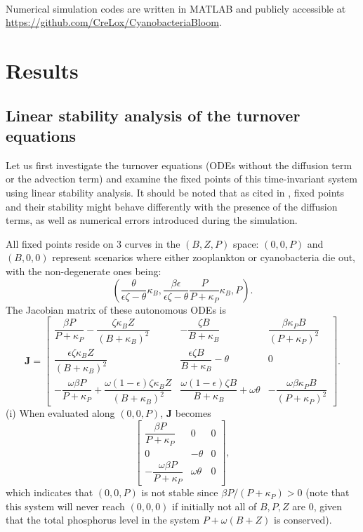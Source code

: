 \documentclass{article}
\renewcommand\vec{\mathbf}
\begin{document}
Numerical simulation codes are written in MATLAB\textsuperscript{\tiny\textregistered} and publicly accessible at \url{https://github.com/CreLox/CyanobacteriaBloom}.

\section*{Results}
\subsection*{Linear stability analysis of the turnover equations}
Let us first investigate the turnover equations (ODEs without the diffusion term or the advection term) and examine the fixed points of this time-invariant system using linear stability analysis. It should be noted that as cited in \cite{SteeleHenderson}, fixed points and their stability might behave differently with the presence of the diffusion terms, as well as numerical errors introduced during the simulation.

All fixed points reside on 3 curves in the $(B, Z, P)$ space: $(0, 0, P)$ and $(B, 0, 0)$ represent scenarios where either zooplankton or cyanobacteria die out, with the non-degenerate ones being:
\begin{equation}
    (\frac{\theta}{\epsilon\zeta-\theta}\kappa_B, \frac{\beta\epsilon}{\epsilon\zeta-\theta}\frac{P}{P+\kappa_P}\kappa_B, P). \label{Non-trivialFP}
\end{equation} 
The Jacobian matrix of these autonomous ODEs is
\begin{equation*}
    \vec{J} = \begin{bmatrix}
    \dfrac{\beta P}{P + \kappa_P} - \dfrac{\zeta \kappa_B Z}{(B + \kappa_B)^2} & - \dfrac{\zeta B}{B + \kappa_B} & \dfrac{\beta \kappa_P B}{(P + \kappa_P)^2} \\[1.5em]
    \dfrac{\epsilon \zeta \kappa_B Z}{(B + \kappa_B)^2} & \dfrac{\epsilon \zeta B}{B + \kappa_B} - \theta & 0 \\[1.5em]
    -\dfrac{\omega \beta P}{P + \kappa_P} + \dfrac{\omega (1 - \epsilon) \zeta \kappa_B Z}{(B + \kappa_B)^2} & \dfrac{\omega (1 - \epsilon) \zeta B}{B + \kappa_B} + \omega \theta & -\dfrac{\omega \beta \kappa_P B}{(P + \kappa_P)^2}
    \end{bmatrix}.
\end{equation*}
(i) When evaluated along $(0, 0, P)$, $\vec{J}$ becomes
\begin{equation*}
    \begin{bmatrix}
    \dfrac{\beta P}{P + \kappa_P} & 0 & 0 \\[1.5em]
    0 & - \theta & 0 \\[1.5em]
    -\dfrac{\omega \beta P}{P + \kappa_P} & \omega \theta & 0
    \end{bmatrix},
\end{equation*}
which indicates that $(0, 0, P)$ is not stable since $\beta P/(P + \kappa_P) > 0$ (note that this system will never reach $(0, 0, 0)$ if initially not all of $B, P, Z$ are 0, given that the total phosphorus level in the system $P + \omega(B+Z)$ is conserved).
\end{document}
